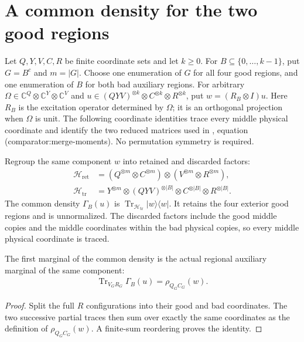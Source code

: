 \section{A common density for the two good regions}
\label{sec:replica_good_pair_marginal}

Let $Q,Y,V,C,R$ be finite coordinate sets and let $k\geq0$.
For $B\subseteq\{0,\ldots,k-1\}$, put $G=B^c$ and $m=|G|$.
Choose one enumeration of $G$ for all four good regions, and one enumeration
of $B$ for both bad auxiliary regions. For arbitrary
$\Omega\in\mathbb C^Q\otimes\mathbb C^Y\otimes\mathbb C^V$ and
$u\in(QYV)^{\otimes k}\otimes C^{\otimes k}\otimes R^{\otimes k}$,
put $w=(R_B\otimes I)u$. Here $R_B$ is the excitation operator determined
by $\Omega$; it is an orthogonal projection when $\Omega$ is unit.
The following coordinate identities trace every middle physical coordinate and identify
the two reduced matrices used
in \cite[Section~7]{OpenAI2026AreaLaw}, equation
(comparator:merge-moments). No permutation symmetry is required.

\begin{definition}
\label{def:replica_good_pair_marginal}
\leanok
{}
Regroup the same component $w$ into retained and discarded factors:
\begin{align}
 \mathcal H_{\mathrm{ret}}
   &=(Q^{\otimes m}\otimes C^{\otimes m})
      \otimes(V^{\otimes m}\otimes R^{\otimes m}),\\
 \mathcal H_{\mathrm{tr}}
   &=Y^{\otimes m}\otimes(QYV)^{\otimes|B|}\otimes C^{\otimes|B|}\otimes R^{\otimes|B|}.
\end{align}
The common density $\Gamma_B(u)$ is
$\operatorname{Tr}_{\mathcal H_{\mathrm{tr}}}|w\rangle\langle w|$.
It retains the four exterior good regions and is unnormalized. The discarded
factors include the good middle copies and the middle coordinates within the
bad physical copies, so every middle physical coordinate is traced.
\end{definition}

\begin{theorem}
\label{thm:replica_good_pair_marginal_right}
\leanok
{}
The first marginal of the common density is the actual regional auxiliary
marginal of the same component:
\begin{align}
 \operatorname{Tr}_{V_G R_G}\Gamma_B(u)=\rho_{Q_G C_G}(w).
\end{align}
\end{theorem}
\begin{proof}
\leanok
Split the full $R$ configurations into their good and bad coordinates.
The two successive partial traces then sum over exactly the same coordinates
as the definition of $\rho_{Q_G C_G}(w)$. A finite-sum reordering proves the identity.
\end{proof}

